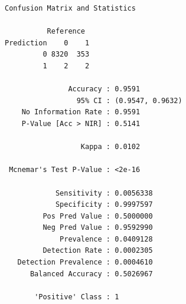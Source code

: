 \documentclass[
  letterpaper,
  DIV=11,
  numbers=noendperiod]{scrreprt}
\newenvironment{Shaded}{\begin{snugshade}}{\end{snugshade}}
\newcommand{\AttributeTok}[1]{\textcolor[rgb]{0.40,0.45,0.13}{#1}}
\newcommand{\DecValTok}[1]{\textcolor[rgb]{0.68,0.00,0.00}{#1}}
\newcommand{\FunctionTok}[1]{\textcolor[rgb]{0.28,0.35,0.67}{#1}}
\newcommand{\NormalTok}[1]{\textcolor[rgb]{0.00,0.23,0.31}{#1}}
\newcommand{\OtherTok}[1]{\textcolor[rgb]{0.00,0.23,0.31}{#1}}
\newcommand{\SpecialCharTok}[1]{\textcolor[rgb]{0.37,0.37,0.37}{#1}}
\newcommand{\StringTok}[1]{\textcolor[rgb]{0.13,0.47,0.30}{#1}}
\begin{document}
\begin{Shaded}
\end{Shaded}

\begin{verbatim}
Confusion Matrix and Statistics

          Reference
Prediction    0    1
         0 8320  353
         1    2    2
                                          
               Accuracy : 0.9591          
                 95% CI : (0.9547, 0.9632)
    No Information Rate : 0.9591          
    P-Value [Acc > NIR] : 0.5141          
                                          
                  Kappa : 0.0102          
                                          
 Mcnemar's Test P-Value : <2e-16          
                                          
            Sensitivity : 0.0056338       
            Specificity : 0.9997597       
         Pos Pred Value : 0.5000000       
         Neg Pred Value : 0.9592990       
             Prevalence : 0.0409128       
         Detection Rate : 0.0002305       
   Detection Prevalence : 0.0004610       
      Balanced Accuracy : 0.5026967       
                                          
       'Positive' Class : 1               
                                          
\end{verbatim}
\end{document}
